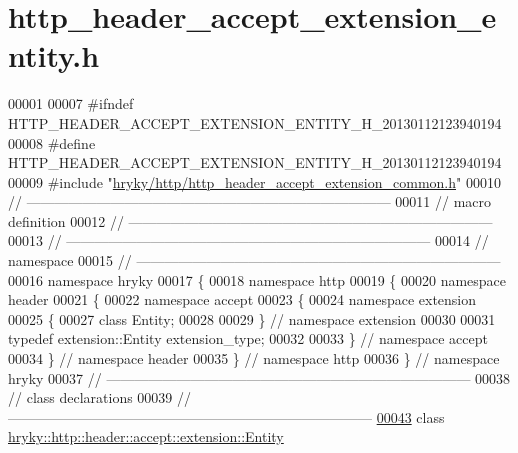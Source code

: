 \hypertarget{http__header__accept__extension__entity_8h_source}{\section{http\-\_\-header\-\_\-accept\-\_\-extension\-\_\-entity.\-h}
}

\begin{DoxyCode}
00001 
00007 \textcolor{preprocessor}{#ifndef HTTP\_HEADER\_ACCEPT\_EXTENSION\_ENTITY\_H\_20130112123940194}
00008 \textcolor{preprocessor}{}\textcolor{preprocessor}{#define HTTP\_HEADER\_ACCEPT\_EXTENSION\_ENTITY\_H\_20130112123940194}
00009 \textcolor{preprocessor}{}\textcolor{preprocessor}{#include "\hyperlink{http__header__accept__extension__common_8h}{hryky/http/http_header_accept_extension_common.h}"}
00010 \textcolor{comment}{//
      ------------------------------------------------------------------------------}
00011 \textcolor{comment}{// macro definition}
00012 \textcolor{comment}{//
      ------------------------------------------------------------------------------}
00013 \textcolor{comment}{//
      ------------------------------------------------------------------------------}
00014 \textcolor{comment}{// namespace}
00015 \textcolor{comment}{//
      ------------------------------------------------------------------------------}
00016 \textcolor{keyword}{namespace }hryky
00017 \{
00018 \textcolor{keyword}{namespace }http
00019 \{
00020 \textcolor{keyword}{namespace }header
00021 \{
00022 \textcolor{keyword}{namespace }accept
00023 \{
00024 \textcolor{keyword}{namespace }extension
00025 \{
00027     \textcolor{keyword}{class }Entity;
00028 
00029 \} \textcolor{comment}{// namespace extension}
00030 
00031 \textcolor{keyword}{typedef} extension::Entity extension\_type;
00032 
00033 \} \textcolor{comment}{// namespace accept}
00034 \} \textcolor{comment}{// namespace header}
00035 \} \textcolor{comment}{// namespace http}
00036 \} \textcolor{comment}{// namespace hryky}
00037 \textcolor{comment}{//
      ------------------------------------------------------------------------------}
00038 \textcolor{comment}{// class declarations}
00039 \textcolor{comment}{//
      ------------------------------------------------------------------------------}
\hypertarget{http__header__accept__extension__entity_8h_source_l00043}{}\hyperlink{classhryky_1_1http_1_1header_1_1accept_1_1extension_1_1_entity}{00043} \textcolor{comment}{}\textcolor{keyword}{class }\hyperlink{classhryky_1_1http_1_1header_1_1accept_1_1extension_1_1_entity}{hryky::http::header::accept::extension::Entity}

\end{DoxyCode}
